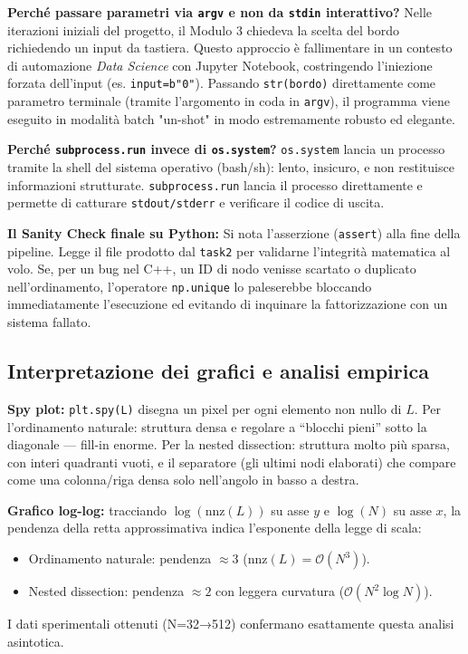 \documentclass[a4paper,11pt]{article}
\theoremstyle{definition}
\begin{document}
\textbf{Perché passare parametri via \texttt{argv} e non da \texttt{stdin} interattivo?} Nelle iterazioni iniziali del progetto, il Modulo 3 chiedeva la scelta del bordo richiedendo un input da tastiera. Questo approccio è fallimentare in un contesto di automazione \textit{Data Science} con Jupyter Notebook, costringendo l'iniezione forzata dell'input (es. \texttt{input=b"0"}). Passando \texttt{str(bordo)} direttamente come parametro terminale (tramite l'argomento in coda in \texttt{argv}), il programma viene eseguito in modalità batch "un-shot" in modo estremamente robusto ed elegante.

\textbf{Perché \texttt{subprocess.run} invece di \texttt{os.system}?} \texttt{os.system} lancia un processo tramite la shell del sistema operativo (bash/sh): lento, insicuro, e non restituisce informazioni strutturate. \texttt{subprocess.run} lancia il processo direttamente e permette di catturare \texttt{stdout/stderr} e verificare il codice di uscita.

\textbf{Il Sanity Check finale su Python:} Si nota l'asserzione (\texttt{assert}) alla fine della pipeline. Legge il file prodotto dal \texttt{task2} per validarne l'integrità matematica al volo. Se, per un bug nel C++, un ID di nodo venisse scartato o duplicato nell'ordinamento, l'operatore \texttt{np.unique} lo paleserebbe bloccando immediatamente l'esecuzione ed evitando di inquinare la fattorizzazione con un sistema fallato.

\subsection{Interpretazione dei grafici e analisi empirica}

\textbf{Spy plot:} \texttt{plt.spy(L)} disegna un pixel per ogni elemento non nullo di $L$. Per l'ordinamento naturale: struttura densa e regolare a ``blocchi pieni'' sotto la diagonale --- fill-in enorme. Per la nested dissection: struttura molto più sparsa, con interi quadranti vuoti, e il separatore (gli ultimi nodi elaborati) che compare come una colonna/riga densa solo nell'angolo in basso a destra.

\textbf{Grafico log-log:} tracciando $\log(\text{nnz}(L))$ su asse $y$ e $\log(N)$ su asse $x$, la pendenza della retta approssimativa indica l'esponente della legge di scala:
\begin{itemize}
  \item Ordinamento naturale: pendenza $\approx 3$ ($\text{nnz}(L) = \mathcal{O}(N^3)$).
  \item Nested dissection: pendenza $\approx 2$ con leggera curvatura ($\mathcal{O}(N^2 \log N)$).
\end{itemize}
I dati sperimentali ottenuti (N=32→512) confermano esattamente questa analisi asintotica.
\end{document}
